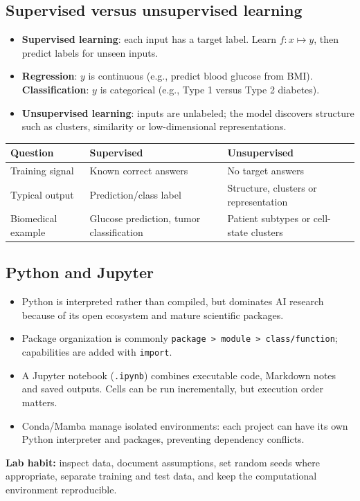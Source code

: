 \documentclass[10pt,a4paper]{ctexart}
\newcommand{\key}[1]{\textbf{#1}}
\begin{document}
\begin{multicols*}{2}
\subsection{Supervised versus unsupervised learning}
\begin{itemize}
  \item \key{Supervised learning}: each input has a target label. Learn \(f:x\mapsto y\), then predict labels for unseen inputs.
  \item \key{Regression}: \(y\) is continuous (e.g., predict blood glucose from BMI). \key{Classification}: \(y\) is categorical (e.g., Type 1 versus Type 2 diabetes).
  \item \key{Unsupervised learning}: inputs are unlabeled; the model discovers structure such as clusters, similarity or low-dimensional representations.
\end{itemize}
\begin{center}\small
\begin{tabularx}{\linewidth}{@{}lYY@{}}
\toprule
Question & Supervised & Unsupervised\\ \midrule
Training signal & Known correct answers & No target answers\\
Typical output & Prediction/class label & Structure, clusters or representation\\
Biomedical example & Glucose prediction, tumor classification & Patient subtypes or cell-state clusters\\
\bottomrule
\end{tabularx}
\end{center}

\subsection{Python and Jupyter}
\begin{itemize}
  \item Python is interpreted rather than compiled, but dominates AI research because of its open ecosystem and mature scientific packages.
  \item Package organization is commonly \texttt{package > module > class/function}; capabilities are added with \texttt{import}.
  \item A Jupyter notebook (\texttt{.ipynb}) combines executable code, Markdown notes and saved outputs. Cells can be run incrementally, but execution order matters.
  \item Conda/Mamba manage isolated environments: each project can have its own Python interpreter and packages, preventing dependency conflicts.
\end{itemize}
\key{Lab habit:} inspect data, document assumptions, set random seeds where appropriate, separate training and test data, and keep the computational environment reproducible.



\end{multicols*}
\end{document}

